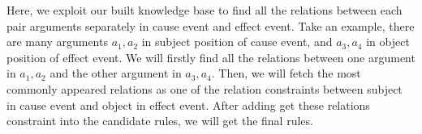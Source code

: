 Here, we exploit our built knowledge base to find all the relations between each pair arguments separately in cause event and effect event.
Take an example, there are many arguments $a_1, a_2$ in subject position of cause event, and $a_3, a_4$ in object position of effect event. We will firstly find all the relations between one argument in $a_1,a_2$ and the other argument in $a_3,a_4$. Then, we will fetch the most commonly appeared relations as one of the relation constraints between subject in cause event and object in effect event.
After adding get these relations constraint into the candidate rules, we will get the final rules.




%


